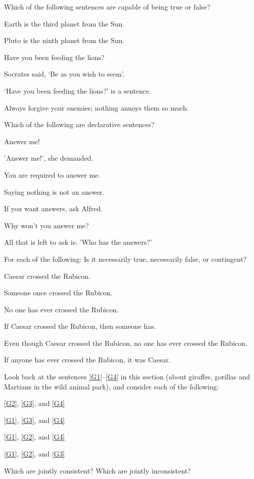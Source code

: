 \practiceproblems
\problempart Which of the following sentences are capable of being true or false?
\begin{earg}
	\item Earth is the third planet from the Sun.
	\item Pluto is the ninth planet from the Sun.
	\item Have you been feeding the lions?
	\item Socrates said, `Be as you wish to seem'.
	\item `Have you been feeding the lions?' is a sentence.
	\item Always forgive your enemies; nothing annoys them so much.
\end{earg}

\problempart Which of the following are declarative sentences?
\begin{earg}
	\item Answer me!
	\item 'Answer me!', she demanded.
	\item You are required to answer me.
	\item Saying nothing is not an answer.
	\item If you want answers, ask Alfred.
	\item Why won't you answer me?
	\item All that is left to ask is: 'Who has the answers?'
\end{earg}

\problempart
\label{pr.EnglishTautology}
For each of the following: Is it necessarily true, necessarily false, or contingent?
\begin{earg}
\item Caesar crossed the Rubicon.
\item Someone once crossed the Rubicon.
\item No one has ever crossed the Rubicon.
\item If Caesar crossed the Rubicon, then someone has.
\item Even though Caesar crossed the Rubicon, no one has ever crossed the Rubicon.
\item If anyone has ever crossed the Rubicon, it was Caesar.
\end{earg}

\problempart
\label{pr.MartianGiraffes}
Look back at the sentences \ref{G1}–\ref{G4} in this section (about giraffes, gorillas and Martians in the wild animal park), and consider each of the following:
\begin{earg}
\item \ref{G2}, \ref{G3}, and \ref{G4}
\item \ref{G1}, \ref{G3}, and \ref{G4}
\item \ref{G1}, \ref{G2}, and \ref{G4}
\item \ref{G1}, \ref{G2}, and \ref{G3}
\end{earg}
Which are jointly consistent? Which are jointly inconsistent? 

